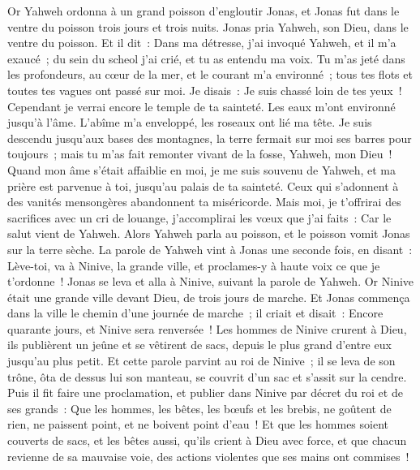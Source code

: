 \begin{multicols}{2}
\VerseOne{}Or Yahweh ordonna à un grand poisson d'engloutir Jonas, et Jonas fut dans le ventre du poisson trois jours et trois nuits.
Jonas pria Yahweh, son Dieu, dans le ventre du poisson.
Et il dit~: Dans ma détresse, j'ai invoqué Yahweh, et il m'a exaucé~; du sein du scheol j'ai crié, et tu as entendu ma voix.
Tu m'as jeté dans les profondeurs, au cœur de la mer, et le courant m'a environné~; tous tes flots et toutes tes vagues ont passé sur moi.
Je disais~: Je suis chassé loin de tes yeux~! Cependant je verrai encore le temple de ta sainteté.
Les eaux m'ont environné jusqu'à l'âme. L'abîme m'a enveloppé, les roseaux ont lié ma tête.
Je suis descendu jusqu'aux bases des montagnes, la terre fermait sur moi ses barres pour toujours~; mais tu m'as fait remonter vivant de la fosse, Yahweh, mon Dieu~!
Quand mon âme s'était affaiblie en moi, je me suis souvenu de Yahweh, et ma prière est parvenue à toi, jusqu'au palais de ta sainteté.
Ceux qui s'adonnent à des vanités mensongères abandonnent ta miséricorde.
Mais moi, je t'offrirai des sacrifices avec un cri de louange, j'accomplirai les vœux que j'ai faits~: Car le salut vient de Yahweh.
Alors Yahweh parla au poisson, et le poisson vomit Jonas sur la terre sèche.
\VerseOne{}La parole de Yahweh vint à Jonas une seconde fois, en disant~:
Lève-toi, va à Ninive, la grande ville, et proclames-y à haute voix ce que je t'ordonne~!
Jonas se leva et alla à Ninive, suivant la parole de Yahweh. Or Ninive était une grande ville devant Dieu, de trois jours de marche.
Et Jonas commença dans la ville le chemin d'une journée de marche~; il criait et disait~: Encore quarante jours, et Ninive sera renversée~!
Les hommes de Ninive crurent à Dieu, ils publièrent un jeûne et se vêtirent de sacs, depuis le plus grand d'entre eux jusqu'au plus petit.
Et cette parole parvint au roi de Ninive~; il se leva de son trône, ôta de dessus lui son manteau, se couvrit d'un sac et s'assit sur la cendre.
Puis il fit faire une proclamation, et publier dans Ninive par décret du roi et de ses grands~: Que les hommes, les bêtes, les bœufs et les brebis, ne goûtent de rien, ne paissent point, et ne boivent point d'eau~!
Et que les hommes soient couverts de sacs, et les bêtes aussi, qu'ils crient à Dieu avec force, et que chacun revienne de sa mauvaise voie, des actions violentes que ses mains ont commises~!

\end{multicols}
